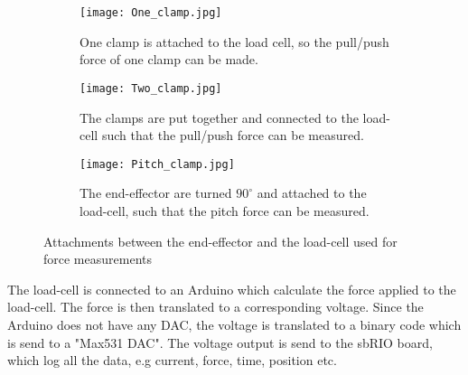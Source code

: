 \begin{figure}[H]
	\centering
	\begin{subfigure}{.32\textwidth}
		\centering
		\vspace{-12pt}
		\texttt{[image: One\_clamp.jpg]}
		\caption{One clamp is attached to the load cell, so the pull/push force of one clamp can be made.}
		\label{fig:one_clamp}
	\end{subfigure}
	\begin{subfigure}{.32\textwidth}
		\centering
		\texttt{[image: Two\_clamp.jpg]}
		\caption{The clamps are put together and connected to the load-cell such that the pull/push force can be measured.}
		\label{fig:two_clamp}
	\end{subfigure}
	\begin{subfigure}{.32\textwidth}
		\centering
		\texttt{[image: Pitch\_clamp.jpg]}
		\caption{The end-effector are turned $90^\circ$ and attached to the load-cell, such that the pitch force can be measured.}
		\label{fig:pitch_force}
	\end{subfigure}
\caption{Attachments between the end-effector and the load-cell used for force measurements}
\label{fig:Overview_endowrist_attachment}
\end{figure}
The load-cell is connected to an Arduino which calculate the force applied to the load-cell. The force is then translated to a corresponding voltage. Since the Arduino does not have any DAC, the voltage is translated to a binary code which is send to a "Max531 DAC". The voltage output is send to the sbRIO board, which log all the data, e.g current, force, time, position etc.




%














